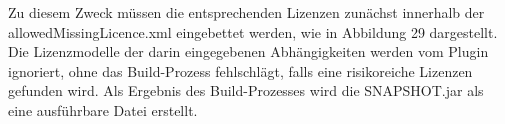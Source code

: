 Zu diesem Zweck müssen die entsprechenden Lizenzen zunächst innerhalb der allowedMissingLicence.xml eingebettet werden, wie in Abbildung 29 dargestellt. Die Lizenzmodelle der darin eingegebenen Abhängigkeiten werden vom Plugin ignoriert, ohne das Build-Prozess fehlschlägt, falls eine risikoreiche Lizenzen gefunden wird. Als Ergebnis des Build-Prozesses wird die SNAPSHOT.jar als eine ausführbare Datei erstellt. 

















